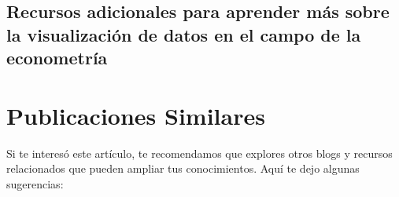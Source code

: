 \documentclass[
  a4paper,
]{article}
\begin{document}
\hypertarget{recursos-adicionales-para-aprender-muxe1s-sobre-la-visualizaciuxf3n-de-datos-en-el-campo-de-la-econometruxeda}{%
\subsection{Recursos adicionales para aprender más sobre la
visualización de datos en el campo de la
econometría}\label{recursos-adicionales-para-aprender-muxe1s-sobre-la-visualizaciuxf3n-de-datos-en-el-campo-de-la-econometruxeda}}

\hypertarget{publicaciones-similares}{%
\section{Publicaciones Similares}\label{publicaciones-similares}}

Si te interesó este artículo, te recomendamos que explores otros blogs y
recursos relacionados que pueden ampliar tus conocimientos. Aquí te dejo
algunas sugerencias:


\printbibliography
\end{document}
